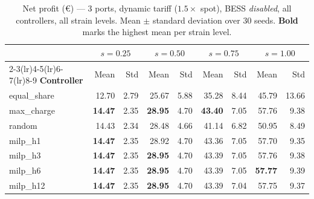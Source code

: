 \begin{table}[!htb]
\centering
\caption{Net profit (€) — 3 ports, dynamic tariff ($1.5\times$ spot),
         BESS \emph{disabled}, all controllers, all strain levels.
         Mean $\pm$ standard deviation over 30 seeds.
         \textbf{Bold} marks the highest mean per strain level.}
\label{tab:gc_dyn_nobess_ms_3p}
\setlength{\tabcolsep}{4.5pt}
\begin{tabular}{l rr rr rr rr}
\toprule
 & \multicolumn{2}{c}{$s=0.25$}
 & \multicolumn{2}{c}{$s=0.50$}
 & \multicolumn{2}{c}{$s=0.75$}
 & \multicolumn{2}{c}{$s=1.00$} \\
\cmidrule(lr){2-3}\cmidrule(lr){4-5}\cmidrule(lr){6-7}\cmidrule(lr){8-9}
\textbf{Controller} & Mean & Std & Mean & Std & Mean & Std & Mean & Std \\
\midrule
equal\_share &  12.70 & 2.79 &  25.67 &  5.88 &  35.28 &  8.44 &  45.79 & 13.66 \\
max\_charge  & \textbf{14.47} & 2.35 & \textbf{28.95} &  4.70 & \textbf{43.40} &  7.05 &  57.76 &  9.38 \\
random       &  14.43 & 2.34 &  28.48 &  4.66 &  41.14 &  6.82 &  50.95 &  8.49 \\
milp\_h1     & \textbf{14.47} & 2.35 &  28.92 &  4.70 &  43.36 &  7.05 &  57.70 &  9.35 \\
milp\_h3     & \textbf{14.47} & 2.35 & \textbf{28.95} &  4.70 &  43.39 &  7.05 &  57.76 &  9.38 \\
milp\_h6     & \textbf{14.47} & 2.35 & \textbf{28.95} &  4.70 &  43.39 &  7.05 & \textbf{57.77} &  9.39 \\
milp\_h12    & \textbf{14.47} & 2.35 & \textbf{28.95} &  4.70 &  43.39 &  7.04 &  57.75 &  9.37 \\
\bottomrule
\end{tabular}
\end{table}


